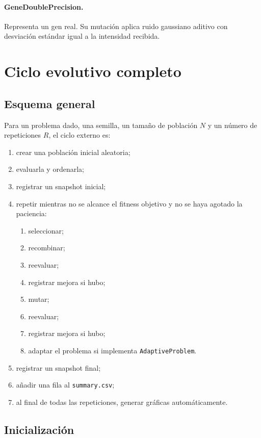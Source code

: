 \documentclass[11pt]{article}
\begin{document}
\paragraph{GeneDoublePrecision.}
Representa un gen real. Su mutaci\'on aplica ruido gaussiano aditivo con
desviaci\'on est\'andar igual a la intensidad recibida.

\section{Ciclo evolutivo completo}

\subsection{Esquema general}

Para un problema dado, una semilla, un tama\~no de poblaci\'on \(N\) y un
n\'umero de repeticiones \(R\), el ciclo externo es:

\begin{enumerate}
  \item crear una poblaci\'on inicial aleatoria;
  \item evaluarla y ordenarla;
  \item registrar un snapshot inicial;
  \item repetir mientras no se alcance el fitness objetivo y no se haya agotado
  la paciencia:
  \begin{enumerate}
    \item seleccionar;
    \item recombinar;
    \item reevaluar;
    \item registrar mejora si hubo;
    \item mutar;
    \item reevaluar;
    \item registrar mejora si hubo;
    \item adaptar el problema si implementa \texttt{AdaptiveProblem}.
  \end{enumerate}
  \item registrar un snapshot final;
  \item a\~nadir una fila al \texttt{summary.csv};
  \item al final de todas las repeticiones, generar gr\'aficas autom\'aticamente.
\end{enumerate}

\subsection{Inicializaci\'on}
\end{document}
